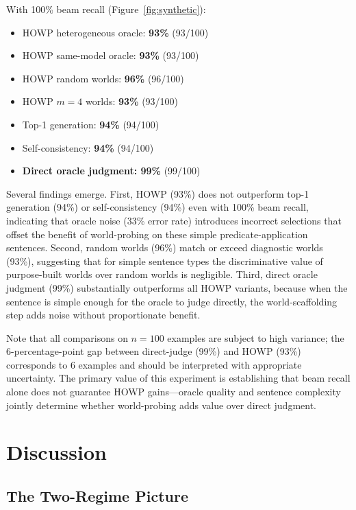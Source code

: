 \documentclass[11pt,letterpaper]{article}
\begin{document}
With 100\% beam recall (Figure~\ref{fig:synthetic}):
\begin{itemize}
  \item HOWP heterogeneous oracle: \textbf{93\%} (93/100)
  \item HOWP same-model oracle: \textbf{93\%} (93/100)
  \item HOWP random worlds: \textbf{96\%} (96/100)
  \item HOWP $m{=}4$ worlds: \textbf{93\%} (93/100)
  \item Top-1 generation: \textbf{94\%} (94/100)
  \item Self-consistency: \textbf{94\%} (94/100)
  \item \textbf{Direct oracle judgment: 99\%} (99/100)
\end{itemize}

Several findings emerge. First, HOWP (93\%) does not outperform top-1 generation (94\%) or self-consistency (94\%) even with 100\% beam recall, indicating that oracle noise (33\% error rate) introduces incorrect selections that offset the benefit of world-probing on these simple predicate-application sentences. Second, random worlds (96\%) match or exceed diagnostic worlds (93\%), suggesting that for simple sentence types the discriminative value of purpose-built worlds over random worlds is negligible. Third, direct oracle judgment (99\%) substantially outperforms all HOWP variants, because when the sentence is simple enough for the oracle to judge directly, the world-scaffolding step adds noise without proportionate benefit.

Note that all comparisons on $n{=}100$ examples are subject to high variance; the 6-percentage-point gap between direct-judge (99\%) and HOWP (93\%) corresponds to 6 examples and should be interpreted with appropriate uncertainty. The primary value of this experiment is establishing that beam recall alone does not guarantee HOWP gains---oracle quality and sentence complexity jointly determine whether world-probing adds value over direct judgment.

\section{Discussion}

\subsection{The Two-Regime Picture}
\end{document}

